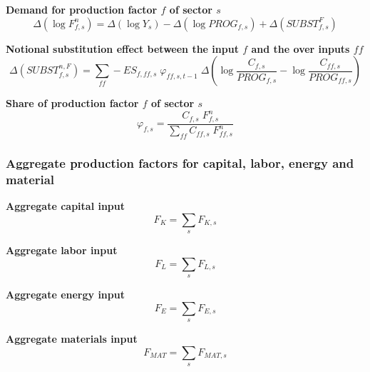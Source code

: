 \documentclass[12pt]{article}
\numberwithin{equation}{section}
\begin{document}
\noindent\textbf{Demand for production factor $f$ of sector $s$} \\
\begin{dmath}
\varDelta \left(\operatorname{log} F^{n}_{f, s}\right) = \varDelta \left(\operatorname{log} Y_{s}\right) - \varDelta \left(\operatorname{log} PROG_{f, s}\right) + \varDelta \left(SUBST^{F}_{f, s}\right)
\end{dmath}

\noindent\textbf{Notional substitution effect between the input $f$ and the over inputs $ff$} \\
\begin{dmath}
\varDelta \left(SUBST^{n,F}_{f, s}\right) = \sum_{ff} -ES_{f, ff, s} \; \varphi_{ff, s, t-1} \; \varDelta \left(\operatorname{log} \frac{C_{f, s}}{PROG_{f, s}} - \operatorname{log} \frac{C_{ff, s}}{PROG_{ff, s}}\right)
\end{dmath}

\noindent\textbf{Share of production factor $f$ of sector $s$} \\
\begin{dmath}
\varphi_{f, s} = \frac{C_{f, s} \; F^{n}_{f, s}}{\sum_{ff} C_{ff, s} \; F^{n}_{ff, s}}
\end{dmath}







\subsubsection{Aggregate production factors for capital, labor, energy and material}


\noindent\textbf{Aggregate capital input} \\
\begin{dmath}
F_{K} = \sum_{s} F_{K, s}
\end{dmath}

\noindent\textbf{Aggregate labor input} \\
\begin{dmath}
F_{L} = \sum_{s} F_{L, s}
\end{dmath}

\noindent\textbf{Aggregate energy input} \\
\begin{dmath}
F_{E} = \sum_{s} F_{E, s}
\end{dmath}

\noindent\textbf{Aggregate materials input} \\
\begin{dmath}
F_{MAT} = \sum_{s} F_{MAT, s}
\end{dmath}
\end{document}
